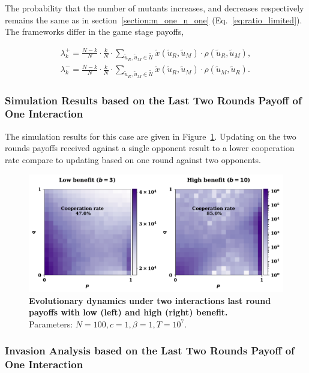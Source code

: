 \documentclass[11pt]{article}
\theoremstyle{plainCl1}
\theoremstyle{plainCl2}
\begin{document}
The probability that the number of mutants increases, and decreases respectively
remains the same as in section~\ref{section:m_one_n_one} (Eq.~\ref{eq:ratio_limited}). The
frameworks differ in the game stage payoffs,

\begin{align}
  \lambda^+_k=\frac{N\!-\!k}{N}\cdot \frac{k}{N}\cdot \sum_{\tilde{u}_{R},\tilde{u}_{M}\in\mathcal{\tilde{U}}} \tilde{x}(\tilde{u}_{R},\tilde{u}_{M})\cdot \rho(\tilde{u}_{R},\tilde{u}_{M}), \\
  \lambda^-_k=\frac{N\!-\!k}{N}\cdot \frac{k}{N}\cdot \sum_{\tilde{u}_{R},\tilde{u}_{M}\in\mathcal{\tilde{U}}} \tilde{x}(\tilde{u}_{R},\tilde{u}_{M})\cdot \rho(\tilde{u}_{M},\tilde{u}_{R}).
\end{align}

\subsubsection*{Simulation Results based on the Last Two Rounds Payoff of One Interaction}

The simulation results for this case are given in
Figure~\ref{fig:two_rounds_results}. Updating on the two rounds payoffs received
against a single opponent result to a lower cooperation rate compare to updating
based on one round against two opponents.

\begin{figure}[!htbp]
  \centering 
  \includegraphics[width=.70\textwidth]{static/two_rounds_donation_game.pdf}
  \caption{\textbf{Evolutionary dynamics under two interactions last round
  payoffs with low (left) and high (right) benefit.}\\Parameters: \(N =100, c=1, \beta=1, T=10 ^7\).
  }\label{fig:two_rounds_results}
\end{figure}

\subsubsection*{Invasion Analysis based on the Last Two Rounds Payoff of One Interaction}
\end{document}
